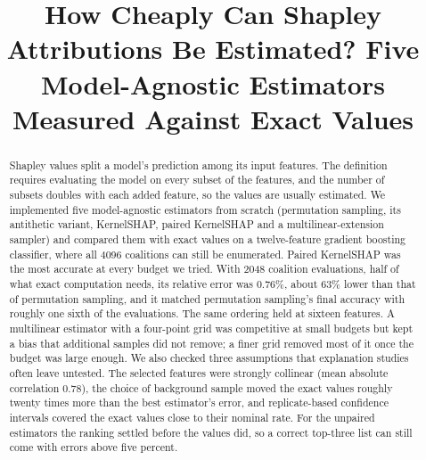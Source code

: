 \documentclass[conference]{IEEEtran}
\begin{document}
\title{How Cheaply Can Shapley Attributions Be Estimated? Five Model-Agnostic Estimators Measured Against Exact Values}

\author{
\and
{}
}

\maketitle

\begin{abstract}
Shapley values split a model's prediction among its input features. The definition requires evaluating the model on every subset of the features, and the number of subsets doubles with each added feature, so the values are usually estimated. We implemented five model-agnostic estimators from scratch (permutation sampling, its antithetic variant, KernelSHAP, paired KernelSHAP and a multilinear-extension sampler) and compared them with exact values on a twelve-feature gradient boosting classifier, where all 4096 coalitions can still be enumerated. Paired KernelSHAP was the most accurate at every budget we tried. With 2048 coalition evaluations, half of what exact computation needs, its relative error was 0.76\%, about 63\% lower than that of permutation sampling, and it matched permutation sampling's final accuracy with roughly one sixth of the evaluations. The same ordering held at sixteen features. A multilinear estimator with a four-point grid was competitive at small budgets but kept a bias that additional samples did not remove; a finer grid removed most of it once the budget was large enough. We also checked three assumptions that explanation studies often leave untested. The selected features were strongly collinear (mean absolute correlation 0.78), the choice of background sample moved the exact values roughly twenty times more than the best estimator's error, and replicate-based confidence intervals covered the exact values close to their nominal rate. For the unpaired estimators the ranking settled before the values did, so a correct top-three list can still come with errors above five percent.
\end{abstract}
\end{document}
